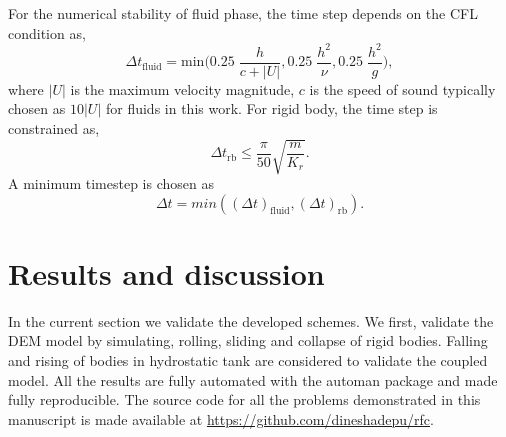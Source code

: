For the numerical stability of fluid phase, the time step depends on the CFL condition as,
\begin{equation}
  \label{eq:rfc:time-step-cfl}
  \Delta t_{\text{fluid}} = \mathrm{min} \bigg( 0.25 \; \frac{h}{c + |U|} ,  0.25 \; \frac{h^2}{\nu},  0.25 \; \frac{h^2}{g} \bigg),
\end{equation}
where $|U|$ is the maximum velocity magnitude, $c$ is the speed of sound
typically chosen as $10 |U|$ for fluids in this work. For rigid body, the time
step is constrained as,
\begin{equation}
  \label{eq:rfc:time-step-body-force}
  \Delta t_{\text{rb}} \leq \frac{\pi}{50} \sqrt{\frac{m}{K_r}}.
\end{equation}
A minimum timestep is chosen as
\begin{equation}
  \label{eq:rfc:time-step-body-force}
  \Delta t = min((\Delta t)_{\text{fluid}}, (\Delta t)_{\text{rb}}).
\end{equation}



\FloatBarrier%
\section{Results and discussion}
\label{sec:rfc:results}
In the current section we validate the developed schemes. We first, validate the
DEM model by simulating, rolling, sliding and collapse of rigid bodies. Falling
and rising of bodies in hydrostatic tank are considered to validate the coupled
model. All the results are fully automated with the automan package
\citep{automan2018} and made fully reproducible. The source code for all the
problems demonstrated in this manuscript is made available at
\url{https://github.com/dineshadepu/rfc}.


\FloatBarrier%
